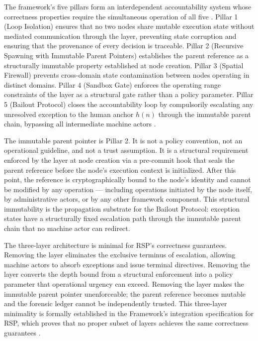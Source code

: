 The framework's five pillars form an interdependent accountability system whose correctness properties require the simultaneous operation of all five \cite{bx3framework}. Pillar 1 (Loop Isolation) ensures that no two nodes share mutable execution state without mediated communication through the \fact{} layer, preventing state corruption and ensuring that the provenance of every decision is traceable. Pillar 2 (Recursive Spawning with Immutable Parent Pointers) establishes the parent reference as a structurally immutable property established at node creation. Pillar 3 (Spatial Firewall) prevents cross-domain state contamination between nodes operating in distinct domains. Pillar 4 (Sandbox Gate) enforces the operating range constraints of the \bounds{} layer as a structural gate rather than a policy parameter. Pillar 5 (Bailout Protocol) closes the accountability loop by compulsorily escalating any unresolved exception to the human anchor $h(n)$ through the immutable parent chain, bypassing all intermediate machine actors \cite{bx3framework}.

The immutable parent pointer is Pillar 2. It is not a policy convention, not an operational guideline, and not a trust assumption. It is a structural requirement enforced by the \fact{} layer at node creation via a pre-commit hook that seals the parent reference before the node's execution context is initialized. After this point, the reference is cryptographically bound to the node's identity and cannot be modified by any operation — including operations initiated by the node itself, by administrative actors, or by any other framework component. This structural immutability is the propagation substrate for the Bailout Protocol: exception states have a structurally fixed escalation path through the immutable parent chain that no machine actor can redirect.

The three-layer architecture is minimal for RSP's correctness guarantees. Removing the \purpose{} layer eliminates the exclusive terminus of escalation, allowing machine actors to absorb exceptions and issue terminal directives. Removing the \bounds{} layer converts the depth bound from a structural enforcement into a policy parameter that operational urgency can exceed. Removing the \fact{} layer makes the immutable parent pointer unenforceable; the parent reference becomes mutable and the forensic ledger cannot be independently trusted. This three-layer minimality is formally established in the \bxthree{} Framework's integration specification for RSP, which proves that no proper subset of layers achieves the same correctness guarantees \cite{bx3framework}.

